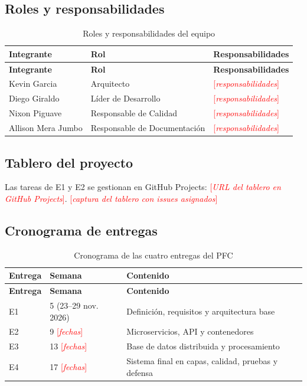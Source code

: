 \documentclass[11pt,a4paper]{article}
\newcommand{\pendiente}[1]{\textcolor{red}{[\textit{#1}]}}
\newcommand{\tablerourl}{\pendiente{URL del tablero en GitHub Projects}}
\begin{document}
\subsection{Roles y responsabilidades}
\begin{xltabular}{\textwidth}{L{3.5cm}L{3.5cm}X}
  \caption{Roles y responsabilidades del equipo}\label{tab:roles}\\
  \toprule
  \textbf{Integrante} & \textbf{Rol} & \textbf{Responsabilidades} \\
  \midrule
  \endfirsthead
  \toprule
  \textbf{Integrante} & \textbf{Rol} & \textbf{Responsabilidades} \\
  \midrule
  \endhead
  \bottomrule
  \endfoot
  Kevin Garcia       & Arquitecto                   & \pendiente{responsabilidades} \\
    Diego Giraldo      & Líder de Desarrollo          & \pendiente{responsabilidades} \\
    Nixon Piguave      & Responsable de Calidad       & \pendiente{responsabilidades} \\
    Allison Mera Jumbo & Responsable de Documentación & \pendiente{responsabilidades} \\
\end{xltabular}

\subsection{Tablero del proyecto}
Las tareas de E1 y E2 se gestionan en GitHub Projects: \tablerourl.
\pendiente{captura del tablero con issues asignados}

\subsection{Cronograma de entregas}
\begin{xltabular}{\textwidth}{llX}
  \caption{Cronograma de las cuatro entregas del PFC}\label{tab:cronograma}\\
  \toprule
  \textbf{Entrega} & \textbf{Semana} & \textbf{Contenido} \\
  \midrule
  \endfirsthead
  \toprule
  \textbf{Entrega} & \textbf{Semana} & \textbf{Contenido} \\
  \midrule
  \endhead
  \bottomrule
  \endfoot
  E1 & 5 (23–29 nov. 2026) & Definición, requisitos y arquitectura base \\
    E2 & 9 \pendiente{fechas}  & Microservicios, API y contenedores \\
    E3 & 13 \pendiente{fechas} & Base de datos distribuida y procesamiento \\
    E4 & 17 \pendiente{fechas} & Sistema final en capas, calidad, pruebas y defensa \\
\end{xltabular}
\end{document}
